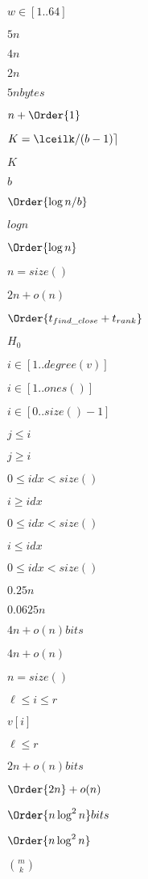 \documentclass{article}
\begin{document}
$w\in [1..64]$
\pagebreak

$ 5n $
\pagebreak

$ 4n $
\pagebreak

$ 2n $
\pagebreak

$5n bytes$
\pagebreak

$ n+\Order{1} $
\pagebreak

$K=\lceilk/(b-1)\rceil$
\pagebreak

$K$
\pagebreak

$ b $
\pagebreak

$\Order{\log n/b}$
\pagebreak

$ log n $
\pagebreak

$\Order{\log n}$
\pagebreak

$n=size()$
\pagebreak

$ 2n+o(n) $
\pagebreak

$ \Order{t_{find\_close} + t_{rank}} $
\pagebreak

$H_0$
\pagebreak

$ i \in [1..degree(v)] $
\pagebreak

$i\in [1..ones()]$
\pagebreak

$ i \in [0..size()-1] $
\pagebreak

$j \leq i$
\pagebreak

$ j \geq i $
\pagebreak

$ 0 \leq idx < size() $
\pagebreak

$i\geq idx$
\pagebreak

$ 0\leq idx < size()$
\pagebreak

$i \leq idx$
\pagebreak

$ 0 \leq idx < size()$
\pagebreak

$ 0.25n$
\pagebreak

$ 0.0625n$
\pagebreak

$4 n+o(n) bits$
\pagebreak

$ 4n+o(n) $
\pagebreak

$ n=size() $
\pagebreak

$\ell \leq i \leq r$
\pagebreak

$ v[i] $
\pagebreak

$ \ell \leq r $
\pagebreak

$2 n+o(n) bits$
\pagebreak

$ \Order{2n}+o(n) $
\pagebreak

$\Order{n\log^2 n} bits$
\pagebreak

$ \Order{n\log^2 n} $
\pagebreak

${m \choose k}$
\pagebreak
\end{document}
